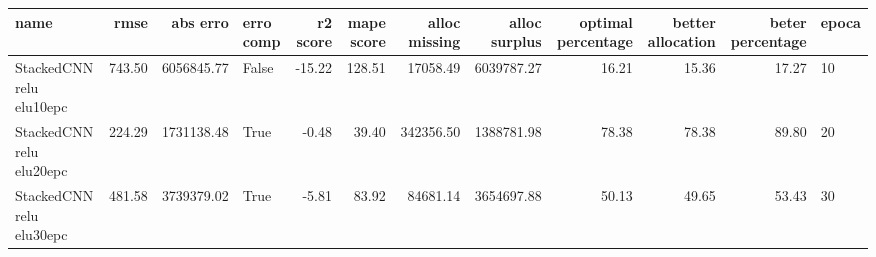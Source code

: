 \begin{tabular}{lrrlrrrrrrrl}
\toprule
name & rmse & abs erro & erro comp & r2 score & mape score & alloc missing & alloc surplus & optimal percentage & better allocation & beter percentage & epoca \\
\midrule
StackedCNN relu elu10epc & 743.50 & 6056845.77 & False & -15.22 & 128.51 & 17058.49 & 6039787.27 & 16.21 & 15.36 & 17.27 & 10 \\
StackedCNN relu elu20epc & 224.29 & 1731138.48 & True & -0.48 & 39.40 & 342356.50 & 1388781.98 & 78.38 & 78.38 & 89.80 & 20 \\
StackedCNN relu elu30epc & 481.58 & 3739379.02 & True & -5.81 & 83.92 & 84681.14 & 3654697.88 & 50.13 & 49.65 & 53.43 & 30 \\
\bottomrule
\end{tabular}

